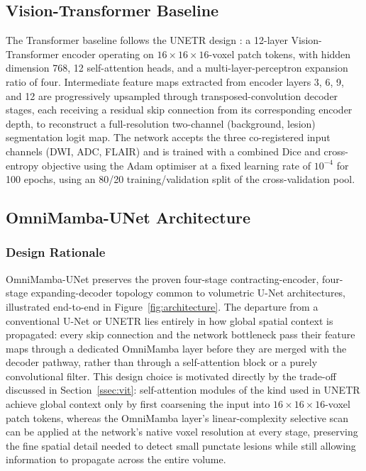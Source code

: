 \documentclass[pdflatex,sn-mathphys-num]{sn-jnl}
\begin{document}
\subsection{Vision-Transformer Baseline}\label{ssec:unetr}
The Transformer baseline follows the UNETR design
\citep{hatamizadeh2022unetr}: a 12-layer Vision-Transformer encoder
operating on $16 \times 16 \times 16$-voxel patch tokens, with hidden dimension 768,
12 self-attention heads, and a multi-layer-perceptron expansion ratio
of four. Intermediate feature maps extracted from encoder layers 3, 6,
9, and 12 are progressively upsampled through transposed-convolution
decoder stages, each receiving a residual skip connection from its
corresponding encoder depth, to reconstruct a full-resolution
two-channel (background, lesion) segmentation logit map. The network
accepts the three co-registered input channels (DWI, ADC, FLAIR) and
is trained with a combined Dice and cross-entropy objective using the
Adam optimiser at a fixed learning rate of $10^{-4}$ for 100 epochs,
using an 80/20 training/validation split of the cross-validation pool.

\subsection{OmniMamba-UNet Architecture}\label{ssec:mamba_arch}

\subsubsection{Design Rationale}
OmniMamba-UNet preserves the proven four-stage contracting-encoder,
four-stage expanding-decoder topology common to volumetric U-Net
architectures, illustrated end-to-end in
Figure~\ref{fig:architecture}. The departure from a conventional U-Net
or UNETR lies entirely in how global spatial context is propagated:
every skip connection and the network bottleneck pass their feature
maps through a dedicated OmniMamba layer before they are merged with
the decoder pathway, rather than through a self-attention block or a
purely convolutional filter. This design choice is motivated directly
by the trade-off discussed in Section~\ref{ssec:vit}: self-attention
modules of the kind used in UNETR achieve global context only by first
coarsening the input into $16 \times 16 \times 16$-voxel patch tokens, whereas the
OmniMamba layer's linear-complexity selective scan can be applied at
the network's native voxel resolution at every stage, preserving the
fine spatial detail needed to detect small punctate lesions while
still allowing information to propagate across the entire volume.
\end{document}
